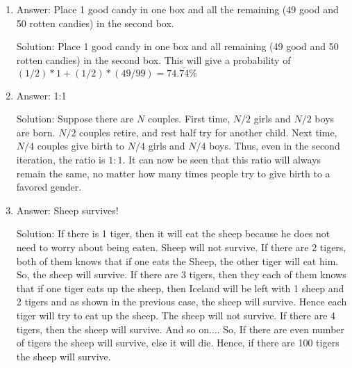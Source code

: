 \begin{enumerate}

\item
Answer: Place 1 good candy in one box and all the remaining (49 good and 50 rotten candies) in the second box.
 
Solution: Place 1 good candy in one box and all remaining (49 good and 50 rotten candies) in the second box.
This will give a probability of $(1/2) * 1 + (1/2) * (49/99) = 74.\bar{74}\%$




\item
Answer: 1:1
 
Solution: Suppose there are $N$ couples. First time, $N/2$ girls and $N/2$ boys are born. $N/2$ couples retire, and rest half try for another child.
Next time, $N/4$ couples give birth to $N/4$ girls and $N/4$ boys. Thus, even in the second iteration, the ratio is $1:1$. It can now be seen that this ratio will always remain the same, no matter how many times people try to give birth to a favored gender.




\item
Answer: Sheep survives!
 
Solution: If there is 1 tiger, then it will eat the sheep because he does not need to worry about being eaten. Sheep will not survive.
If there are 2 tigers, both of them knows that if one eats the Sheep, the other tiger will eat him. So, the sheep will survive.
If there are 3 tigers, then they each of them knows that if one tiger eats up the sheep, then Iceland will be left with 1 sheep and 2 tigers and as shown in the previous case, the sheep will survive. Hence each tiger will try to eat up the sheep. The sheep will not survive.
If there are 4 tigers, then the sheep will survive.
And so on....
So, If there are even number of tigers the sheep will survive, else it will die. Hence, if there are 100 tigers the sheep will survive.





\end{enumerate}
